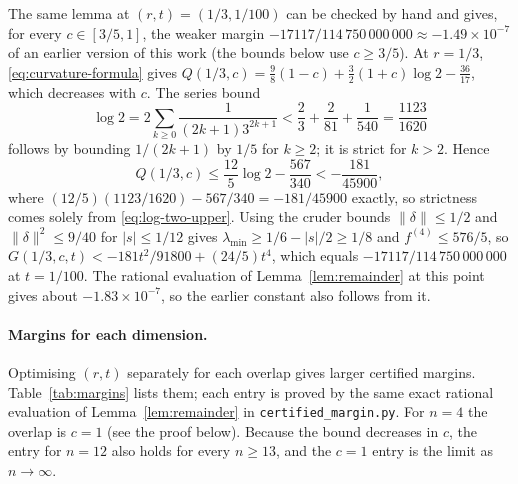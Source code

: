 \begin{remark}
\label{rem:old-constant}
 The same lemma at $(r,t)=(1/3,1/100)$ can be checked by hand and gives,
 for every $c\in[3/5,1]$, the weaker margin
 $-17117/114\,750\,000\,000\approx-1.49\times10^{-7}$
 of an earlier version of this work (the bounds below use $c\geq3/5$).  At $r=1/3$,
 \eqref{eq:curvature-formula} gives
 $Q(1/3,c)=\tfrac98(1-c)+\tfrac32(1+c)\log2-\tfrac{36}{17}$, which
 decreases with $c$.  The series bound
 \begin{equation}
  \log2=2\sum_{k\geq0}\frac1{(2k+1)3^{2k+1}}
   <\frac23+\frac2{81}+\frac1{540}=\frac{1123}{1620}
 \label{eq:log-two-upper}
 \end{equation}
 follows by bounding $1/(2k+1)$ by $1/5$ for $k\geq2$; it is strict for
 $k>2$.  Hence
 \begin{equation}
  Q(1/3,c)\leq\frac{12}{5}\log2-\frac{567}{340}<-\frac{181}{45900},
  \label{eq:uniform-negative-curvature}
 \end{equation}
 where $(12/5)(1123/1620)-567/340=-181/45900$ exactly, so strictness
 comes solely from \eqref{eq:log-two-upper}.  Using the cruder bounds
 $\|\delta\|\leq1/2$ and $\|\delta\|^2\leq9/40$ for $|s|\leq1/12$ gives
 $\lambda_{\min}\geq1/6-|s|/2\geq1/8$ and $f^{(4)}\leq576/5$, so
 $G(1/3,c,t)<-181t^2/91800+(24/5)t^4$, which equals
 $-17117/114\,750\,000\,000$ at $t=1/100$.  The rational evaluation of
 Lemma~\ref{lem:remainder} at this point gives about
 $-1.83\times10^{-7}$, so the earlier constant also follows from it.
\end{remark}

\paragraph{Margins for each dimension.}
Optimising $(r,t)$ separately for each overlap gives larger certified
margins.  Table~\ref{tab:margins} lists them; each entry is proved by the
same exact rational evaluation of Lemma~\ref{lem:remainder} in
\texttt{certified\_margin.py}.  For $n=4$ the overlap is $c=1$
(see the proof below).  Because the bound decreases in $c$, the entry
for $n=12$ also holds for every $n\geq13$, and the $c=1$ entry is the
limit as $n\to\infty$.

